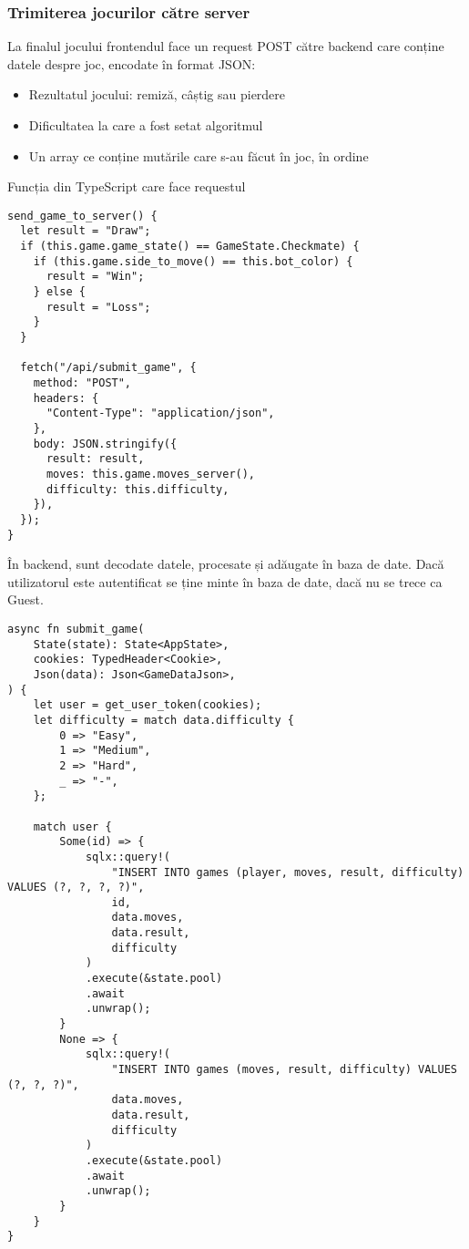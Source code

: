 \newpage
\subsubsection{Trimiterea jocurilor către server}

La finalul jocului frontendul face un request POST către backend care conține datele despre joc,
encodate în format JSON:
\begin{itemize}
	\item Rezultatul jocului: remiză, câștig sau pierdere
	\item Dificultatea la care a fost setat algoritmul
	\item Un array ce conține mutările care s-au făcut în joc, în ordine
\end{itemize}

Funcția din TypeScript care face requestul
\begin{lstlisting}[language=RustHtml]
send_game_to_server() {
  let result = "Draw";
  if (this.game.game_state() == GameState.Checkmate) {
    if (this.game.side_to_move() == this.bot_color) {
      result = "Win";
    } else {
      result = "Loss";
    }
  }

  fetch("/api/submit_game", {
    method: "POST",
    headers: {
      "Content-Type": "application/json",
    },
    body: JSON.stringify({
      result: result,
      moves: this.game.moves_server(),
      difficulty: this.difficulty,
    }),
  });
}
\end{lstlisting}

În backend, sunt decodate datele, procesate și adăugate în baza de date. Dacă utilizatorul
este autentificat se ține minte în baza de date, dacă nu se trece ca Guest.
\begin{lstlisting}[language=RustHtml]
async fn submit_game(
    State(state): State<AppState>,
    cookies: TypedHeader<Cookie>,
    Json(data): Json<GameDataJson>,
) {
    let user = get_user_token(cookies);
    let difficulty = match data.difficulty {
        0 => "Easy",
        1 => "Medium",
        2 => "Hard",
        _ => "-",
    };

    match user {
        Some(id) => {
            sqlx::query!(
                "INSERT INTO games (player, moves, result, difficulty) VALUES (?, ?, ?, ?)",
                id,
                data.moves,
                data.result,
                difficulty
            )
            .execute(&state.pool)
            .await
            .unwrap();
        }
        None => {
            sqlx::query!(
                "INSERT INTO games (moves, result, difficulty) VALUES (?, ?, ?)",
                data.moves,
                data.result,
                difficulty
            )
            .execute(&state.pool)
            .await
            .unwrap();
        }
    }
}
\end{lstlisting}
